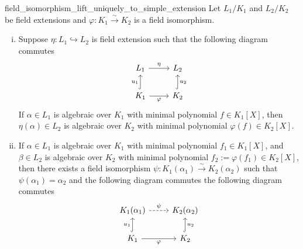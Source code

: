 \begin{proposition}{}{field_isomorphism_lift_uniquely_to_simple_extension}
    Let $L_1/K_1$ and $L_2/K_2$ be field extensions and $\varphi:K_1\xrightarrow{\sim} K_2$ is a field isomorphism. 
    \begin{enumerate}[(i)]
        \item Suppose $\eta:L_1\hookrightarrow L_2$ is field extension such that the following diagram commutes
        \[
            \begin{tikzcd}
                L_1\arrow[r, "\eta"]                    & L_2                   \\
                K_1 \arrow[u, "u_1", hook] \arrow[r, "\varphi"'] & K_2 \arrow[u, "u_2"', hook]
                \end{tikzcd}
        \]
        If $\alpha\in L_1$ is algebraic over $K_1$ with minimal polynomial $f\in K_1[X]$, then $\eta(\alpha)\in L_2$ is algebraic over $K_2$ with minimal polynomial $\varphi(f)\in K_2[X]$.
        \item If $\alpha\in L_1$ is algebraic over $K_1$ with minimal polynomial $f_1\in K_1[X]$, and $\beta\in L_2$ is algebraic over $K_2$ with minimal polynomial $f_2:=\varphi(f_1)\in K_2[X]$, then  there exists a field isomorphism $\psi:K_1(\alpha_1)\xrightarrow{\sim} K_2(\alpha_2)$ such that $\psi(\alpha_1)=\alpha_2$ and the following diagram commutes
        the following diagram commutes
    \[
        \begin{tikzcd}
            K_1(\alpha_1) \arrow[r, "\psi", dashed]                    & K_2(\alpha_2)                        \\
            K_1 \arrow[u, "u_1", hook] \arrow[r, "\varphi"'] & K_2 \arrow[u, "u_2"', hook]
            \end{tikzcd}
    \]
    \end{enumerate}
    
\end{proposition}
